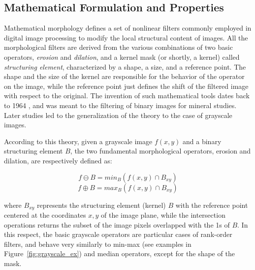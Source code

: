 \documentclass{ieeeaccess}
\begin{document}
\subsection{Mathematical Formulation and Properties}
Mathematical morphology defines a set of nonlinear filters commonly employed in digital image processing to modify the local structural content of images. All the morphological filters are derived from the various combinations of two basic operators, \textit{erosion} and \textit{dilation}, and a kernel mask (or shortly, a kernel) called \textit{structuring element}, characterized by a shape, a size, and a reference point. The shape and the size of the kernel are responsible for the behavior of the operator on the image, while the reference point just defines the shift of the filtered image with respect to the original. The invention of such mathematical tools dates back to 1964 \cite{haas1967morphologie}, and was meant to the filtering of binary images for mineral studies. Later studies \cite{nakagawa1977note} led to the generalization of the theory to the case of grayscale images.

According to this theory, given a grayscale image $f(x,y)$ and a binary structuring element $B$, the two fundamental morphological operators, erosion and dilation, are respectively defined as:

\begin{equation} \label{eq:erode}
f \ominus B = min_B(f(x,y) \cap B_{xy})
\end{equation}
\vspace{-0.5cm}
\begin{equation} \label{eq:dilate}
f \oplus B = max_B(f(x,y) \cap B_{xy})
\end{equation}

where $B_{xy}$ represents the structuring element (kernel) $B$ with the reference point centered at the coordinates $x,y$ of the image plane, while the intersection operations returns the subset of the image pixels overlapped with the 1s of $B$. In this respect, the basic grayscale operators are particular cases of rank-order filters, and behave very similarly to min-max (see examples in Figure~\ref{fig:grayscale_ex}) and median operators, except for the shape of the mask. 
\end{document}
